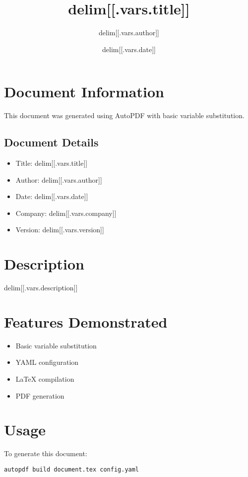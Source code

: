 \documentclass{article}
\title{delim[[.vars.title]]}
\author{delim[[.vars.author]]}
\date{delim[[.vars.date]]}
\begin{document}
\maketitle

\section{Document Information}
This document was generated using AutoPDF with basic variable substitution.

\subsection{Document Details}
\begin{itemize}
\item Title: delim[[.vars.title]]
\item Author: delim[[.vars.author]]
\item Date: delim[[.vars.date]]
\item Company: delim[[.vars.company]]
\item Version: delim[[.vars.version]]
\end{itemize}

\section{Description}
delim[[.vars.description]]

\section{Features Demonstrated}
\begin{itemize}
\item Basic variable substitution
\item YAML configuration
\item LaTeX compilation
\item PDF generation
\end{itemize}

\section{Usage}
To generate this document:
\begin{verbatim}
autopdf build document.tex config.yaml
\end{verbatim}
\end{document}
